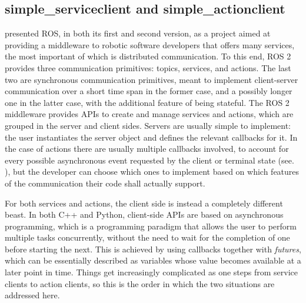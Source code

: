 \subsection{simple\_serviceclient and simple\_actionclient}
\label{sec:simple_serviceclient_actionclient}
 presented ROS, in both its first and second version, as a project aimed at providing a middleware to robotic software developers that offers many services, the most important of which is distributed communication. To this end, ROS 2 provides three communication primitives: topics, services, and actions. The last two are synchronous communication primitives, meant to implement client-server communication over a short time span in the former case, and a possibly longer one in the latter case, with the additional feature of being stateful. The ROS 2 middleware provides APIs to create and manage services and actions, which are grouped in the server and client sides. Servers are usually simple to implement: the user instantiates the server object and defines the relevant callbacks for it. In the case of actions there are usually multiple callbacks involved, to account for every possible asynchronous event requested by the client or terminal state (see. ), but the developer can choose which ones to implement based on which features of the communication their code shall actually support.

For both services and actions, the client side is instead a completely different beast. In both C++ and Python, client-side APIs are based on asynchronous programming, which is a programming paradigm that allows the user to perform multiple tasks concurrently, without the need to wait for the completion of one before starting the next. This is achieved by using callbacks together with \emph{futures}, which can be essentially described as variables whose value becomes available at a later point in time. Things get increasingly complicated as one steps from service clients to action clients, so this is the order in which the two situations are addressed here.

